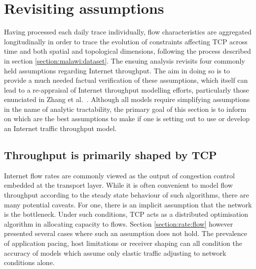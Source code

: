 %
%
\section{Revisiting assumptions}
\label{section:rate:analysis}

Having processed each daily trace individually, flow characteristics are aggregated longitudinally in order to trace the evolution of constraints affecting \ac{TCP} across time and both spatial and topological dimensions, following the process described in section \ref{section:malawi:dataset}.
The ensuing analysis revisits four commonly held assumptions regarding Internet throughput. 
The aim in doing so is to provide a much needed factual verification of these assumptions, which itself can lead to a re-appraisal of Internet throughput modelling efforts, particularly those enunciated in Zhang et al.\ \cite{Zhang:2002p85}.
Although all models require simplifying assumptions in the name of analytic tractability, the primary goal of this section is to inform on which are the best assumptions to make if one is setting out to use or develop an Internet traffic throughput model. 

\subsection{Throughput is primarily shaped by \acs{TCP}}

Internet flow rates are commonly viewed as the output of congestion control embedded at the transport layer. While it is often convenient to model flow throughput according to the steady state behaviour of such algorithms, there are many potential caveats.
For one, there is an implicit assumption that the network is the bottleneck. Under such conditions, \ac{TCP} acts as a distributed optimisation algorithm in allocating capacity to flows. Section \ref{section:rate:flow} however presented several cases where such an assumption does not hold. The prevalence of application pacing, host limitations or receiver shaping can all condition the accuracy of models which assume only elastic traffic adjusting to network conditions alone.

